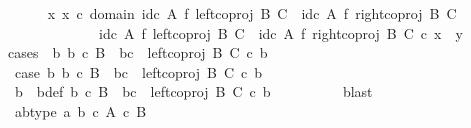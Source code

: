 \begin{isabellebody}
\ \ \ \ \isamarkupfalse%
\ {\isachardoublequoteopen}{\isasymexists}x{\isachardot}{\kern0pt}\ x\ {\isasymin}\isactrlsub c\ domain\ {\isacharparenleft}{\kern0pt}{\isacharparenleft}{\kern0pt}id\isactrlsub c\ A\ {\isasymtimes}\isactrlsub f\ left{\isacharunderscore}{\kern0pt}coproj\ B\ C{\isacharparenright}{\kern0pt}\ {\isasymamalg}\ {\isacharparenleft}{\kern0pt}id\isactrlsub c\ A\ {\isasymtimes}\isactrlsub f\ right{\isacharunderscore}{\kern0pt}coproj\ B\ C{\isacharparenright}{\kern0pt}{\isacharparenright}{\kern0pt}\ {\isasymand}\isanewline
\ \ \ \ \ \ \ \ \ \ \ \ \ {\isacharparenleft}{\kern0pt}id\isactrlsub c\ A\ {\isasymtimes}\isactrlsub f\ left{\isacharunderscore}{\kern0pt}coproj\ B\ C{\isacharparenright}{\kern0pt}\ {\isasymamalg}\ {\isacharparenleft}{\kern0pt}id\isactrlsub c\ A\ {\isasymtimes}\isactrlsub f\ right{\isacharunderscore}{\kern0pt}coproj\ B\ C{\isacharparenright}{\kern0pt}\ {\isasymcirc}\isactrlsub c\ x\ {\isacharequal}{\kern0pt}\ y{\isachardoublequoteclose}\isanewline
\ \ \ \ \isamarkupfalse%
{\isacharparenleft}{\kern0pt}cases\ {\isachardoublequoteopen}{\isasymexists}\ b{\isachardot}{\kern0pt}\ b\ {\isasymin}\isactrlsub c\ B\ {\isasymand}\ bc\ {\isacharequal}{\kern0pt}\ left{\isacharunderscore}{\kern0pt}coproj\ B\ C\ {\isasymcirc}\isactrlsub c\ b{\isachardoublequoteclose}{\isacharparenright}{\kern0pt}\isanewline
\ \ \ \ \ \ \isamarkupfalse%
\ case{}{\isacharcolon}{\kern0pt}\ {\isachardoublequoteopen}{\isasymexists}b{\isachardot}{\kern0pt}\ b\ {\isasymin}\isactrlsub c\ B\ {\isasymand}\ bc\ {\isacharequal}{\kern0pt}\ left{\isacharunderscore}{\kern0pt}coproj\ B\ C\ {\isasymcirc}\isactrlsub c\ b{\isachardoublequoteclose}\isanewline
\ \ \ \ \ \ \isamarkupfalse%
\ \isamarkupfalse%
\ b\ \ b{\isacharunderscore}{\kern0pt}def{\isacharcolon}{\kern0pt}\ {\isachardoublequoteopen}b\ {\isasymin}\isactrlsub c\ B\ {\isasymand}\ bc\ {\isacharequal}{\kern0pt}\ left{\isacharunderscore}{\kern0pt}coproj\ B\ C\ {\isasymcirc}\isactrlsub c\ b{\isachardoublequoteclose}\isanewline
\ \ \ \ \ \ \ \ \isamarkupfalse%
\ blast\isanewline
\ \ \ \ \ \ \isamarkupfalse%
\ \isamarkupfalse%
\ ab{\isacharunderscore}{\kern0pt}type{\isacharcolon}{\kern0pt}\ {\isachardoublequoteopen}{\isasymlangle}a{\isacharcomma}{\kern0pt}\ b{\isasymrangle}\ {\isasymin}\isactrlsub c\ {\isacharparenleft}{\kern0pt}A\ {\isasymtimes}\isactrlsub c\ B{\isacharparenright}{\kern0pt}{\isachardoublequoteclose}\isanewline
\ \ \ \ \ \ \ \ \isamarkupfalse%

\end{isabellebody}
